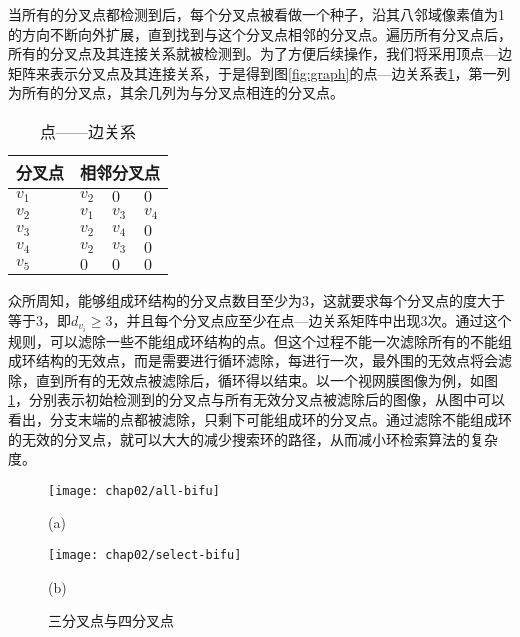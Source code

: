 当所有的分叉点都检测到后，每个分叉点被看做一个种子，沿其八邻域像素值为1的方向不断向外扩展，直到找到与这个分叉点相邻的分叉点。遍历所有分叉点后，所有的分叉点及其连接关系就被检测到。为了方便后续操作，我们将采用顶点---边矩阵来表示分叉点及其连接关系，于是得到图\ref{fig:graph}的点---边关系表\ref{tab:AdjacentStructure}，第一列为所有的分叉点，其余几列为与分叉点相连的分叉点。
\renewcommand\arraystretch{0.8}
\begin{table}[H]
\caption{点——边关系}
\centering
\begin{tabular}{p{2cm}<{\centering}p{1cm}<{\centering}p{1cm}<{\centering}p{1cm}<{\centering}}
  \hline
  分叉点 & \multicolumn{3}{c}{相邻分叉点}\\
  \hline
  \rowcolor{gray!50}
  $v_{1}$ & $v_{2}$  & $0$      & $0$  \\
  $v_{2}$ & $v_{1}$  & $v_{3}$  & $v_{4}$ \\
  \rowcolor{gray!50}
  $v_{3}$ & $v_{2}$  & $v_{4}$  & $0$\\
  $v_{4}$ & $v_{2}$  & $v_{3}$  & $0$ \\
  \rowcolor{gray!50}
  $v_{5}$ & $0$      & $0$      & $0$\\
  \hline
\end{tabular}
\label{tab:AdjacentStructure}
\end{table}

众所周知，能够组成环结构的分叉点数目至少为3，这就要求每个分叉点的度大于等于3，即$d_{v_i} \geq 3$，并且每个分叉点应至少在点---边关系矩阵中出现3次。通过这个规则，可以滤除一些不能组成环结构的点。但这个过程不能一次滤除所有的不能组成环结构的无效点，而是需要进行循环滤除，每进行一次，最外围的无效点将会滤除，直到所有的无效点被滤除后，循环得以结束。以一个视网膜图像为例，如图\ref{fig:Bifurcation}，分别表示初始检测到的分叉点与所有无效分叉点被滤除后的图像，从图中可以看出，分支末端的点都被滤除，只剩下可能组成环的分叉点。通过滤除不能组成环的无效的分叉点，就可以大大的减少搜索环的路径，从而减小环检索算法的复杂度。

\begin{figure}[H]
\centering
  \begin{minipage}[b]{0.48\textwidth} 
      \centering 
      \texttt{[image: chap02/all-bifu]}
        \centerline{(a)}\medskip
	 \label{fig:3FeaturePoint}
    \end{minipage}
  \begin{minipage}[b]{0.48\textwidth}
    \centering
    \texttt{[image: chap02/select-bifu]}
      \centerline{(b)}\medskip
	\label{fig:4FeaturePoint}
  \end{minipage}
\caption{三分叉点与四分叉点}
\label{fig:Bifurcation}
\end{figure}

